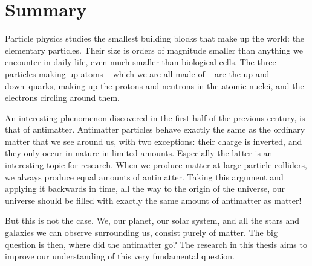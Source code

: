 \chapter*{Summary}
\setcounter{figure}{0}
\renewcommand\thefigure{\arabic{figure}}
\renewcommand\theequation{\arabic{figure}}

Particle physics studies the smallest building blocks that make up the world: the elementary particles.
Their size is orders of magnitude smaller than anything we encounter in daily life, even much smaller than biological cells.
The three particles making up atoms -- which we are all made of -- are the up and down~quarks, making up the protons and neutrons in the atomic nuclei, and the electrons circling around them.

An interesting phenomenon discovered in the first half of the previous century, is that of antimatter.
Antimatter particles behave exactly the same as the ordinary matter that we see around us, with two exceptions: their charge is inverted, and they only occur in nature in limited amounts.
Especially the latter is an interesting topic for research.
When we produce matter at large particle colliders, we always produce equal amounts of antimatter.
Taking this argument and applying it backwards in time, all the way to the origin of the universe, our universe should be filled with exactly the same amount of antimatter as matter!

But this is not the case.
We, our planet, our solar system, and all the stars and galaxies we can observe surrounding us, consist purely of matter.
The big question is then, where did the antimatter go?
The research in this thesis aims to improve our understanding of this very fundamental question.

